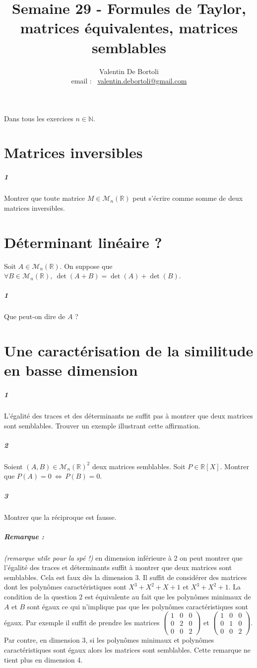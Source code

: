 \documentclass[10pt,a4paper]{article}
\title{Semaine 29 - Formules de Taylor, matrices équivalentes, matrices semblables}
\author{Valentin De Bortoli \\ email : \ \href{mailto:valentin.debortoli@gmail.com}{valentin.debortoli@gmail.com}}
\date{}
\begin{document}
\maketitle
Dans tous les exercices $n \in \mathbb{N}$.
\section{Matrices inversibles}
\subparagraph{1}Montrer que toute matrice $M \in \mathcal{M}_n\left( \mathbb{R} \right)$ peut s'écrire comme somme de deux matrices inversibles.

\section{Déterminant linéaire ?}
Soit $A \in \mathcal{M}_n \left( \mathbb{R} \right)$. On suppose que $\forall B \in \mathcal{M}_n \left( \mathbb{R} \right), \ \det(A+B) = \det(A) + \det(B)$.
\subparagraph{1}Que peut-on dire de $A$ ?

\section{Une caractérisation de la similitude en basse dimension}
\subparagraph{1}L'égalité des traces et des déterminants ne suffit pas à montrer que deux matrices sont semblables. Trouver un exemple illustrant cette affirmation.
\subparagraph{2}Soient $(A,B) \in \mathcal{M}_n \left( \mathbb{R} \right)^2$ deux matrices semblables. Soit $P \in \mathbb{R}[X]$. Montrer que $P(A) = 0 \ \Leftrightarrow \ P(B) =0$.
\subparagraph{3}Montrer que la réciproque est fausse.
\subparagraph{Remarque :} \textit{(remarque utile pour la spé !)} en dimension inférieure à 2 on peut montrer que l'égalité des traces et déterminants suffit à montrer que deux matrices sont semblables. Cela est faux dès la dimension 3. Il suffit de considérer des matrices dont les polynômes caractéristiques sont $X^3+X^2+X+1$ et $X^3+X^2+1$. La condition de la question 2 est équivalente au fait que les polynômes minimaux de $A$ et $B$ sont égaux ce qui n'implique pas que les polynômes caractéristiques sont égaux. Par exemple il suffit de prendre les matrices $\left( \begin{matrix} 1 & 0 & 0 \\
0 & 2 & 0  \\ 
0 & 0 & 2\end{matrix} \right)$ et $\left( \begin{matrix} 1 & 0 & 0 \\
0 & 1 & 0  \\ 
0 & 0 & 2\end{matrix} \right)$. Par contre, en dimension 3, si les polynômes minimaux et polynômes caractéristiques sont égaux alors les matrices sont semblables. Cette remarque ne tient plus en dimension 4.
\end{document}
